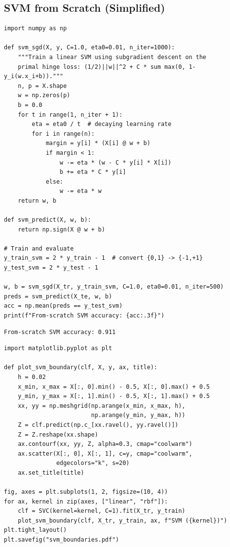 \subsection{SVM from Scratch (Simplified)}

\begin{codeblock}[title=\textbf{Soft-Margin SVM via Subgradient Descent}]
\begin{verbatim}
import numpy as np

def svm_sgd(X, y, C=1.0, eta0=0.01, n_iter=1000):
    """Train a linear SVM using subgradient descent on the
    primal hinge loss: (1/2)||w||^2 + C * sum max(0, 1-y_i(w.x_i+b))."""
    n, p = X.shape
    w = np.zeros(p)
    b = 0.0
    for t in range(1, n_iter + 1):
        eta = eta0 / t  # decaying learning rate
        for i in range(n):
            margin = y[i] * (X[i] @ w + b)
            if margin < 1:
                w -= eta * (w - C * y[i] * X[i])
                b += eta * C * y[i]
            else:
                w -= eta * w
    return w, b

def svm_predict(X, w, b):
    return np.sign(X @ w + b)

# Train and evaluate
y_train_svm = 2 * y_train - 1  # convert {0,1} -> {-1,+1}
y_test_svm = 2 * y_test - 1

w, b = svm_sgd(X_tr, y_train_svm, C=1.0, eta0=0.01, n_iter=500)
preds = svm_predict(X_te, w, b)
acc = np.mean(preds == y_test_svm)
print(f"From-scratch SVM accuracy: {acc:.3f}")
\end{verbatim}
\end{codeblock}

\begin{codeoutput}
\begin{verbatim}
From-scratch SVM accuracy: 0.911
\end{verbatim}
\end{codeoutput}

\begin{codeblock}[title=\textbf{Visualising Decision Boundary}]
\begin{verbatim}
import matplotlib.pyplot as plt

def plot_svm_boundary(clf, X, y, ax, title):
    h = 0.02
    x_min, x_max = X[:, 0].min() - 0.5, X[:, 0].max() + 0.5
    y_min, y_max = X[:, 1].min() - 0.5, X[:, 1].max() + 0.5
    xx, yy = np.meshgrid(np.arange(x_min, x_max, h),
                         np.arange(y_min, y_max, h))
    Z = clf.predict(np.c_[xx.ravel(), yy.ravel()])
    Z = Z.reshape(xx.shape)
    ax.contourf(xx, yy, Z, alpha=0.3, cmap="coolwarm")
    ax.scatter(X[:, 0], X[:, 1], c=y, cmap="coolwarm",
               edgecolors="k", s=20)
    ax.set_title(title)

fig, axes = plt.subplots(1, 2, figsize=(10, 4))
for ax, kernel in zip(axes, ["linear", "rbf"]):
    clf = SVC(kernel=kernel, C=1).fit(X_tr, y_train)
    plot_svm_boundary(clf, X_tr, y_train, ax, f"SVM ({kernel})")
plt.tight_layout()
plt.savefig("svm_boundaries.pdf")
\end{verbatim}
\end{codeblock}

